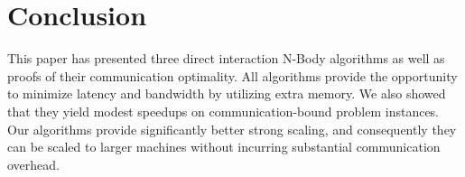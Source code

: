 \section{Conclusion}

This paper has presented three direct interaction N-Body algorithms as well as proofs of their communication optimality. All algorithms provide the opportunity to minimize latency and bandwidth by utilizing extra memory. We also showed that they yield modest speedups on communication-bound problem instances. Our algorithms provide significantly better strong scaling, and consequently they can be scaled to larger machines without incurring substantial communication overhead.
